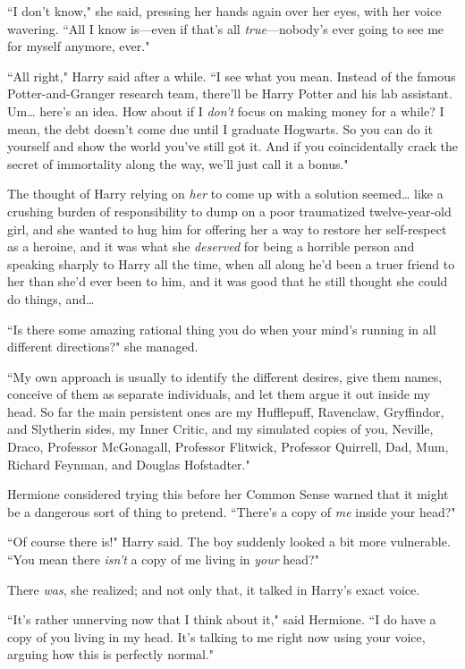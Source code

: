 ``I don't know," she said, pressing her hands again over her eyes, with her voice wavering. ``All I know is—even if that's all \emph{true}—nobody's ever going to see me for myself anymore, ever."

``All right," Harry said after a while. ``I see what you mean. Instead of the famous Potter-and-Granger research team, there'll be Harry Potter and his lab assistant. Um{\ldots} here's an idea. How about if I \emph{don't} focus on making money for a while? I mean, the debt doesn't come due until I graduate Hogwarts. So you can do it yourself and show the world you've still got it. And if you coincidentally crack the secret of immortality along the way, we'll just call it a bonus."

The thought of Harry relying on \emph{her} to come up with a solution seemed{\ldots} like a crushing burden of responsibility to dump on a poor traumatized twelve-year-old girl, and she wanted to hug him for offering her a way to restore her self-respect as a heroine, and it was what she \emph{deserved} for being a horrible person and speaking sharply to Harry all the time, when all along he'd been a truer friend to her than she'd ever been to him, and it was good that he still thought she could do things, and{\ldots}

``Is there some amazing rational thing you do when your mind's running in all different directions?" she managed.

``My own approach is usually to identify the different desires, give them names, conceive of them as separate individuals, and let them argue it out inside my head. So far the main persistent ones are my Hufflepuff, Ravenclaw, Gryffindor, and Slytherin sides, my Inner Critic, and my simulated copies of you, Neville, Draco, Professor McGonagall, Professor Flitwick, Professor Quirrell, Dad, Mum, Richard Feynman, and Douglas Hofstadter."

Hermione considered trying this before her Common Sense warned that it might be a dangerous sort of thing to pretend. ``There's a copy of \emph{me} inside your head?"

``Of course there is!" Harry said. The boy suddenly looked a bit more vulnerable. ``You mean there \emph{isn't} a copy of me living in \emph{your} head?"

There \emph{was}, she realized; and not only that, it talked in Harry's exact voice.

``It's rather unnerving now that I think about it," said Hermione. ``I do have a copy of you living in my head. It's talking to me right now using your voice, arguing how this is perfectly normal."

